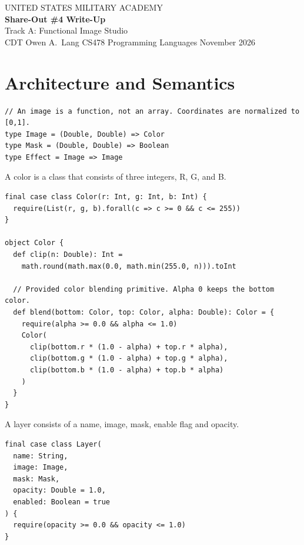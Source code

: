 \documentclass[11pt,letterpaper]{article}
\newcommand{\code}[1]{\texttt{#1}}
\begin{document}
\begin{center}
  {\sffamily\small\color{accent} UNITED STATES MILITARY ACADEMY}\\[6pt]
  {\sffamily\LARGE\bfseries\color{accent} Share-Out \#4 Write-Up}\\[4pt]
  {\sffamily\large Track A: Functional Image Studio}\\[10pt]
  {\normalsize CDT Owen A.\ Lang \quad\textbullet\quad CS478 Programming Languages \quad\textbullet{} November 2026}
\end{center}
\vspace{4pt}

\section{Architecture and Semantics}

\begin{lstlisting}[caption={Core types (\code{Basics.scala})}]
// An image is a function, not an array. Coordinates are normalized to [0,1].
type Image = (Double, Double) => Color
type Mask = (Double, Double) => Boolean
type Effect = Image => Image
\end{lstlisting}

A color is a class that consists of three integers, R, G, and B.

\begin{lstlisting}[caption={\code{Color} and its blending primitive (\code{Basics.scala})}]
final case class Color(r: Int, g: Int, b: Int) {
  require(List(r, g, b).forall(c => c >= 0 && c <= 255))
}

object Color {
  def clip(n: Double): Int =
    math.round(math.max(0.0, math.min(255.0, n))).toInt

  // Provided color blending primitive. Alpha 0 keeps the bottom color.
  def blend(bottom: Color, top: Color, alpha: Double): Color = {
    require(alpha >= 0.0 && alpha <= 1.0)
    Color(
      clip(bottom.r * (1.0 - alpha) + top.r * alpha),
      clip(bottom.g * (1.0 - alpha) + top.g * alpha),
      clip(bottom.b * (1.0 - alpha) + top.b * alpha)
    )
  }
}
\end{lstlisting}

A layer consists of a name, image, mask, enable flag and opacity.

\begin{lstlisting}[caption={\code{Layer} (\code{Basics.scala})}]
final case class Layer(
  name: String,
  image: Image,
  mask: Mask,
  opacity: Double = 1.0,
  enabled: Boolean = true
) {
  require(opacity >= 0.0 && opacity <= 1.0)
}
\end{lstlisting}
\end{document}
